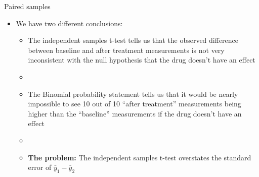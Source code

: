 \documentclass[xcolor=dvipsnames]{beamer}
\begin{document}
\begin{frame}{Paired samples}
	\begin{itemize}
		\item We have two different conclusions:
		\begin{itemize}
			\item The independent samples t-test tells us that the observed difference between baseline and after treatment measurements is not very inconsistent with the null hypothesis that the drug doesn't have an effect \pause
			\item[]
			\item The Binomial probability statement tells us that it would be nearly impossible to see 10 out of 10 ``after treatment'' measurements being higher than the ``baseline'' measurements if the drug doesn't have an effect \pause
			\item[] 
			\item \textbf{The problem:} The independent samples t-test overstates the standard error of $\bar{y}_1 - \bar{y}_2$
		\end{itemize}
	\end{itemize}
\end{frame}
\end{document}
